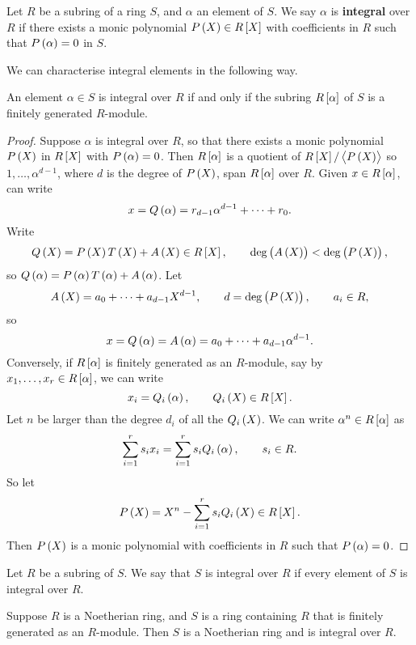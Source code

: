 \begin{definition}
Let $ R $ be a subring of a ring $ S $, and $ \alpha $ an element of $ S $. We say $ \alpha $ is \textbf{integral} over $ R $ if there exists a monic polynomial $ P\br{X} \in R\sbr{X} $ with coefficients in $ R $ such that $ P\br{\alpha} = 0 $ in $ S $.
\end{definition}

We can characterise integral elements in the following way.

\begin{proposition}
An element $ \alpha \in S $ is integral over $ R $ if and only if the subring $ R\sbr{\alpha} $ of $ S $ is a finitely generated $ R $-module.
\end{proposition}

\begin{proof}
Suppose $ \alpha $ is integral over $ R $, so that there exists a monic polynomial $ P\br{X} $ in $ R\sbr{X} $ with $ P\br{\alpha} = 0 $. Then $ R\sbr{\alpha} $ is a quotient of $ R\sbr{X} / \abr{P\br{X}} $ so $ 1, \dots, \alpha^{d - 1} $, where $ d $ is the degree of $ P\br{X} $, span $ R\sbr{\alpha} $ over $ R $. Given $ x \in R\sbr{\alpha} $, can write
$$ x = Q\br{\alpha} = r_{d - 1}\alpha^{d - 1} + \dots + r_0. $$
Write
$$ Q\br{X} = P\br{X}T\br{X} + A\br{X} \in R\sbr{X}, \qquad \deg\br{A\br{X}} < \deg\br{P\br{X}}, $$
so $ Q\br{\alpha} = P\br{\alpha}T\br{\alpha} + A\br{\alpha} $. Let
$$ A\br{X} = a_0 + \dots + a_{d - 1}X^{d - 1}, \qquad d = \deg\br{P\br{X}}, \qquad a_i \in R, $$
so
$$ x = Q\br{\alpha} = A\br{\alpha} = a_0 + \dots + a_{d - 1}\alpha^{d - 1}. $$
Conversely, if $ R\sbr{\alpha} $ is finitely generated as an $ R $-module, say by $ x_1, \dots, x_r \in R\sbr{\alpha} $, we can write
$$ x_i = Q_i\br{\alpha}, \qquad Q_i\br{X} \in R\sbr{X}. $$
Let $ n $ be larger than the degree $ d_i $ of all the $ Q_i\br{X} $. We can write $ \alpha^n \in R\sbr{\alpha} $ as
$$ \sum_{i = 1}^r s_ix_i = \sum_{i = 1}^r s_iQ_i\br{\alpha}, \qquad s_i \in R. $$
So let
$$ P\br{X} = X^n - \sum_{i = 1}^r s_iQ_i\br{X} \in R\sbr{X}. $$
Then $ P\br{X} $ is a monic polynomial with coefficients in $ R $ such that $ P\br{\alpha} = 0 $.
\end{proof}

\begin{definition}
Let $ R $ be a subring of $ S $. We say that $ S $ is integral over $ R $ if every element of $ S $ is integral over $ R $.
\end{definition}

\begin{proposition}
Suppose $ R $ is a Noetherian ring, and $ S $ is a ring containing $ R $ that is finitely generated as an $ R $-module. Then $ S $ is a Noetherian ring and is integral over $ R $.
\end{proposition}

